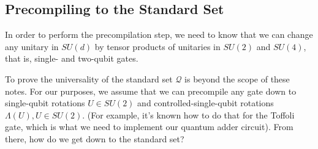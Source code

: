 \subsection{Precompiling to the Standard Set}
\label{subsec:precompile}

In order to perform the precompilation step, we need to know that we can
change any unitary in $SU(d)$ by tensor products of unitaries in $SU(2)$
and $SU(4)$, that is, single- and two-qubit gates.

To prove the universality of the standard set $\mathcal{Q}$ is beyond the
scope of these notes. For our purposes, we assume that we can precompile
any gate down to single-qubit rotations $U \in SU(2)$ and
controlled-single-qubit rotations $\Lambda(U), U\in SU(2)$.
(For example, it's known how to do that for the Toffoli gate, which is what we
need to implement our quantum adder circuit).
From there, how do we get down to the standard set?

%
%
%

